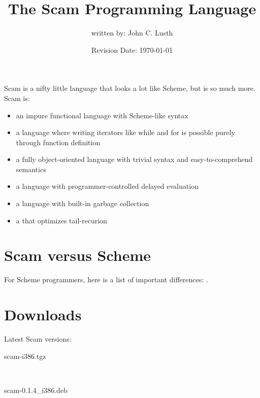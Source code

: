 \documentclass{article}
\title{The Scam Programming Language}
\author{written by: John C. Lusth}
\date{Revision Date: \today}
\begin{document}
\maketitle

\W{}

Scam is a nifty little language
that looks a lot like Scheme, but is so much more.
Scam is:

\begin{itemize}
    \item
        an impure functional language with Scheme-like syntax
    \item
        a language where writing iterators like while and for
        is possible purely through function definition
    \item
        a fully object-oriented language with trivial syntax and
        easy-to-comprehend semantics
    \item
        a language with programmer-controlled delayed
        evaluation
    \item
        a language with built-in garbage collection
    \item
        a that optimizes tail-recurion
\end{itemize}

\section*{Scam versus Scheme}

For Scheme programmers, here is a list of important
differences: .

\section*{Downloads}

Latest Scam versions:

\begin{description}
    \item
         {scam-i386.tgz}
    \item
    \item
    \item
        ~
    \item
         {scam-0.1.4\_i386.deb}
    \item
\end{description}
\end{document}
